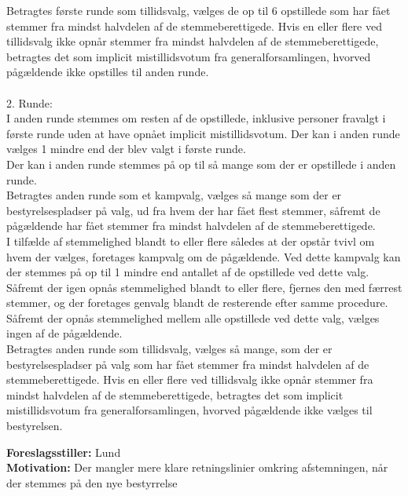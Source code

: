 \documentclass[a4paper,12pt,danish]{article}
\newcommand\who[1]{
    \textbf{Foreslagsstiller:} #1\\
}
\newcommand\why[1]{
    \textbf{Motivation:} #1\\
}
\begin{document}
{{Betragtes første runde som tillidsvalg, vælges de op til 6 opstillede som har fået stemmer fra mindst halvdelen af de stemmeberettigede. Hvis en eller flere ved tillidsvalg ikke opnår stemmer fra mindst halvdelen af de stemmeberettigede, betragtes det som implicit mistillidsvotum fra generalforsamlingen, hvorved pågældende ikke opstilles til anden runde.\\
\\
2. Runde:\\
I anden runde stemmes om resten af de opstillede, inklusive personer fravalgt i første runde uden at have opnået implicit mistillidsvotum. Der kan i anden runde vælges 1 mindre end der blev valgt i første runde.\\
Der kan i anden runde stemmes på op til så mange som der er opstillede i anden runde.\\
Betragtes anden runde som et kampvalg, vælges så mange som der er bestyrelsespladser på valg, ud fra hvem der har fået flest stemmer, såfremt de pågældende har fået stemmer fra mindst halvdelen af de stemmeberettigede.\\
I tilfælde af stemmelighed blandt to eller flere således at der opstår tvivl om hvem der vælges, foretages kampvalg om de pågældende. Ved dette kampvalg kan der stemmes på op til 1 mindre end antallet af de opstillede ved dette valg. Såfremt der igen opnås stemmelighed blandt to eller flere, fjernes den med færrest stemmer, og der foretages genvalg blandt de resterende efter samme procedure. Såfremt der opnås stemmelighed mellem alle opstillede ved dette valg, vælges ingen af de pågældende.\\
Betragtes anden runde som tillidsvalg, vælges så mange, som der er bestyrelsespladser på valg som har fået stemmer fra mindst halvdelen af de stemmeberettigede. Hvis en eller flere ved tillidsvalg ikke opnår stemmer fra mindst halvdelen af de stemmeberettigede, betragtes det som implicit mistillidsvotum fra generalforsamlingen, hvorved pågældende ikke vælges til bestyrelsen.}
    \who{Lund}
    \why{Der mangler mere klare retningslinier omkring afstemningen, når der stemmes på den nye bestyrrelse}
}
\end{document}
